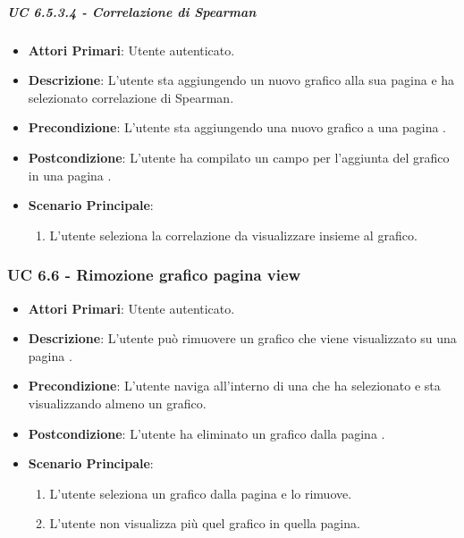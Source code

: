 			\subparagraph{UC 6.5.3.4 - Correlazione di Spearman}
			\begin{itemize}
				\item \textbf{Attori Primari}: Utente autenticato.
				\item \textbf{Descrizione}: L'utente sta aggiungendo un nuovo grafico alla sua pagina  e ha selezionato correlazione di Spearman. 
				\item \textbf{Precondizione}: L'utente sta aggiungendo una nuovo grafico a una pagina .
				\item \textbf{Postcondizione}: L'utente ha compilato un campo per l'aggiunta del grafico in una pagina .
				\item \textbf{Scenario Principale}:
				\begin{enumerate}
					\item{L'utente seleziona la correlazione da visualizzare insieme al grafico.}
				\end{enumerate}	
			\end{itemize}


			\subsubsection{UC 6.6 - Rimozione grafico pagina view}
			\begin{itemize}
				\item \textbf{Attori Primari}: Utente autenticato.
				\item \textbf{Descrizione}: L'utente può rimuovere un grafico che viene visualizzato su una pagina .
				\item \textbf{Precondizione}: L'utente naviga all'interno di una  che ha selezionato e sta visualizzando almeno un grafico.
				\item \textbf{Postcondizione}: L'utente ha eliminato un grafico dalla pagina  .
				\item \textbf{Scenario Principale}:
				\begin{enumerate}
					\item{L'utente seleziona un grafico dalla pagina  e lo rimuove.}
					\item{L'utente non visualizza più quel grafico in quella pagina.}
				\end{enumerate}	
			\end{itemize}